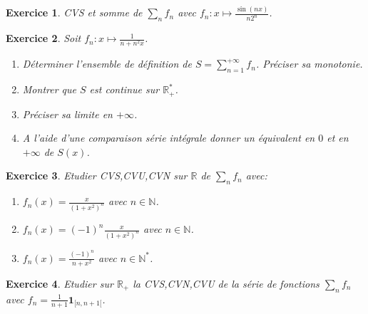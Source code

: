 \documentclass[12pt,a4paper]{article}
\newcommand{\R}{\mathbb{R}}
\newcommand{\N}{\mathbb{N}}
\newcommand{\E}{\mathrm{e}}
\theoremstyle{break}
\theoremstyle{break}
\newtheorem{Exo}{Exercice}
\begin{document}
\begin{Exo}
	CVS et somme de $\sum_n f_n$ avec $f_n:x\mapsto \frac{\sin(nx)}{n2^n}$.
\end{Exo}

\begin{Exo}
	Soit $f_n:x\mapsto \frac{1}{n+n^2x}$.
	\begin{enumerate}
		\item
		Déterminer l'ensemble de définition de $S=\sum_{n=1}^{+\infty}f_n$. Préciser sa monotonie.
		\item Montrer que $S$ est continue sur $\R_+^*$.
		\item Préciser sa limite en $+\infty$.
		\item A l'aide d'une comparaison série intégrale donner un équivalent en $0$ et en $+\infty$ de $S(x)$.
	\end{enumerate}
\end{Exo}

%		



\begin{Exo}
	Etudier CVS,CVU,CVN sur $\R$ de $\sum_n f_n$ avec:
	\begin{enumerate}
		\item
		$f_n(x)=\frac{x}{\left(1+x^2\right)^n}$ avec $n\in\N$.
		\item
		$f_n(x)=(-1)^{n}\frac{x}{\left(1+x^2\right)^n}$ avec $n\in\N$.
		\item
		$f_n(x)=\frac{(-1)^n}{n+x^2}$ avec $n\in\N^*$.
	\end{enumerate}
	
\end{Exo}


\begin{Exo}
	Etudier sur $\R_+$ la CVS,CVN,CVU de la série de fonctions $\sum_n f_n$ avec $f_n=\frac{1}{n+1}\mathbf{1}_{[n,n+1[}$.
\end{Exo}
\end{document}
